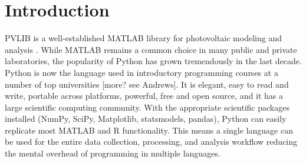 \documentclass[conference]{IEEEtran}
\begin{document}
%



\section{Introduction}

PVLIB is a well-established MATLAB library for photovoltaic modeling and analysis \cite{pvlibstein}. 
While MATLAB remains a common choice in many public and private laboratories, the popularity of Python has grown tremendously in the last decade. 
Python is now the language used in introductory programming courses at a number of top universities \cite{acmpython}[more? see Andrews]. 
It is elegant, easy to read and write, portable across platforms, powerful, free and open source, and it has a large scientific computing community. 
With the appropriate scientific packages installed (NumPy, SciPy, Matplotlib, statsmodels, pandas), Python can easily replicate most MATLAB and R functionality. 
This means a single language can be used for the entire data collection, processing, and analysis workflow reducing the mental overhead of programming in multiple languages. 
\end{document}
